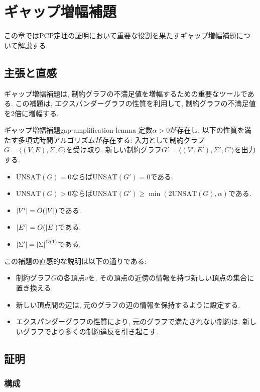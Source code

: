 \chapter{ギャップ増幅補題} \label{chap:gap-amplification}
この章ではPCP定理の証明において重要な役割を果たすギャップ増幅補題について解説する.

\section{主張と直感}

ギャップ増幅補題は, 制約グラフの不満足値を増幅するための重要なツールである. この補題は, エクスパンダーグラフの性質を利用して, 制約グラフの不満足値を2倍に増幅する.

\begin{lemma}{ギャップ増幅補題}{gap-amplification-lemma}
  定数$\alpha > 0$が存在し, 以下の性質を満たす多項式時間アルゴリズムが存在する:
  入力として制約グラフ$G = \langle(V, E), \Sigma, C\rangle$を受け取り, 新しい制約グラフ$G' = \langle(V', E'), \Sigma', C'\rangle$を出力する.
  \begin{itemize}
  \item $\mathrm{UNSAT}(G) = 0$ならば$\mathrm{UNSAT}(G') = 0$である.
  \item $\mathrm{UNSAT}(G) > 0$ならば$\mathrm{UNSAT}(G') \ge \min(2\mathrm{UNSAT}(G), \alpha)$である.
  \item $\abs{V'} = O(\abs{V})$である.
  \item $\abs{E'} = O(\abs{E})$である.
  \item $\abs{\Sigma'} = \abs{\Sigma}^{O(1)}$である.
  \end{itemize}
\end{lemma}

この補題の直感的な説明は以下の通りである:
\begin{itemize}
\item 制約グラフ$G$の各頂点$v$を, その頂点の近傍の情報を持つ新しい頂点の集合に置き換える.
\item 新しい頂点間の辺は, 元のグラフの辺の情報を保持するように設定する.
\item エクスパンダーグラフの性質により, 元のグラフで満たされない制約は, 新しいグラフでより多くの制約違反を引き起こす.
\end{itemize}

\section{証明}
\subsection{構成}

